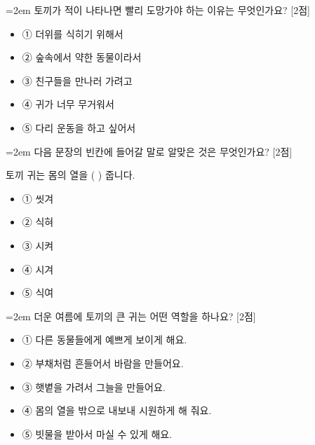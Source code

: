 \documentclass[12pt,a4paper]{article}
\newcommand{\qnum}[1]{%
  \tikz[baseline=(num.base)]{%
    \node[circle, fill=numCircle, text=white, inner sep=0pt,
          minimum size=18pt, font=\small\bfseries] (num) {#1};%
  }%
}
\newcommand{\pts}[1]{%
  \hfill\textcolor{ptsBadge}{[#1점]}%
}
\begin{document}
\vspace{4mm}
\begin{samepage}
{\hangindent=2em
\qnum{26}\enspace 토끼가 적이 나타나면 빨리 도망가야 하는 이유는 무엇인가요? \pts{2}
\par}

\vspace{3mm}
\begin{itemize}[leftmargin=2.5em, labelsep=0.3em, label={}, itemsep=4pt, parsep=1pt, topsep=0pt]
  \item ① 더위를 식히기 위해서
  \item ② 숲속에서 약한 동물이라서
  \item ③ 친구들을 만나러 가려고
  \item ④ 귀가 너무 무거워서
  \item ⑤ 다리 운동을 하고 싶어서
\end{itemize}
\end{samepage}

\vspace{4mm}
\begin{samepage}
{\hangindent=2em
\qnum{27}\enspace 다음 문장의 빈칸에 들어갈 말로 알맞은 것은 무엇인가요? \pts{2}
\par}

\vspace{3mm}
\begin{tcolorbox}[bogi]
토끼 귀는 몸의 열을 (          ) 줍니다.
\end{tcolorbox}
\vspace{3mm}
\begin{itemize}[leftmargin=2.5em, labelsep=0.3em, label={}, itemsep=4pt, parsep=1pt, topsep=0pt]
  \item ① 씻겨
  \item ② 식혀
  \item ③ 시켜
  \item ④ 시겨
  \item ⑤ 식여
\end{itemize}
\end{samepage}

\vspace{4mm}
\begin{samepage}
{\hangindent=2em
\qnum{28}\enspace 더운 여름에 토끼의 큰 귀는 어떤 역할을 하나요? \pts{2}
\par}

\vspace{3mm}
\begin{itemize}[leftmargin=2.5em, labelsep=0.3em, label={}, itemsep=4pt, parsep=1pt, topsep=0pt]
  \item ① 다른 동물들에게 예쁘게 보이게 해요.
  \item ② 부채처럼 흔들어서 바람을 만들어요.
  \item ③ 햇볕을 가려서 그늘을 만들어요.
  \item ④ 몸의 열을 밖으로 내보내 시원하게 해 줘요.
  \item ⑤ 빗물을 받아서 마실 수 있게 해요.
\end{itemize}
\end{samepage}
\end{document}
